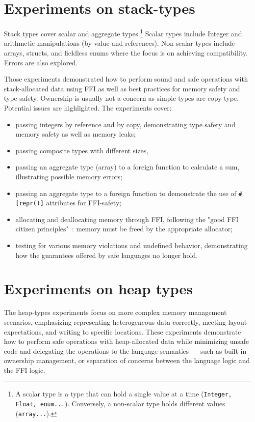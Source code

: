 \documentclass[nomenclature, english, bibtex]{kththesis}
\begin{document}
\section{Experiments on stack-types}
\label{sec:experimentstack}
Stack types cover scalar and aggregate types.\footnote{A scalar type is a type that can hold a single value at a time (\texttt{Integer, Float, enum...}). Conversely, a non-scalar type holds different values (\texttt{array...}).} Scalar types include Integer and arithmetic manipulations (by value and references). Non-scalar types include arrays, structs, and fieldless enums where the focus is on achieving compatibility. Errors are also explored.

Those experiments demonstrated how to perform sound and safe operations with stack-allocated data using \gls{FFI}
as well as best practices for memory safety and type safety. Ownership is usually not a concern as simple types are \gls{copy-type}.
Potential issues are highlighted. 
The experiments cover:

\begin{itemize}
    \item passing integers by reference and by copy, demonstrating type safety and memory safety as well as memory leaks;
    \item passing composite types with different sizes,
    \item passing an aggregate type (array) to a foreign function to calculate a sum, illustrating possible memory errors;
    \item passing an aggregate type to a foreign function to demonstrate the use of \texttt{\#[repr()]} attributes for FFI-safety;
    \item allocating and deallocating memory through FFI, following the "good FFI citizen principles"~\cite{gjengset_rust_2021}: memory must be freed by the appropriate allocator; 
    \item testing for various memory violations and undefined behavior, demonstrating how the guarantees offered by safe languages no longer hold.
\end{itemize}
 
\section{Experiments on heap types}
\label{sec:experimentsheap}

The heap-types experiments focus on more complex memory management scenarios, emphasizing representing heterogeneous data correctly, meeting layout expectations, and writing to specific locations.
These experiments demonstrate how to perform safe operations with heap-allocated data while minimizing unsafe code and delegating the operations to the language semantics --- such as built-in ownership management, or separation of concerns between the language logic and the FFI logic.
\end{document}

